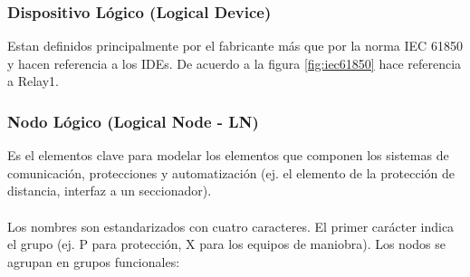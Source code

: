 \documentclass[a5paper]{book}%
\begin{document}
\subsubsection{ Dispositivo Lógico (Logical Device)}

Estan definidos principalmente por el fabricante más que por la norma IEC 61850 y hacen referencia a los IDEs. De acuerdo a la figura \ref{fig:iec61850} hace referencia a Relay1.

\subsubsection{Nodo Lógico (Logical Node - LN)}

Es el elementos clave para modelar los elementos que componen los sistemas de comunicación, protecciones y automatización (ej. el elemento de la protección de distancia, interfaz a un seccionador).\\\\

Los nombres son estandarizados con cuatro caracteres. El primer carácter indica el grupo  (ej. P para protección, X para los equipos de maniobra). Los nodos se agrupan en grupos funcionales:
\end{document}
